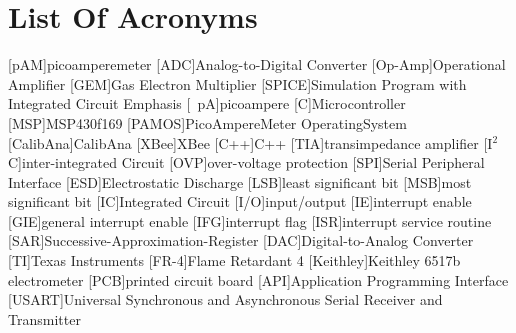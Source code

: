 \section{List Of Acronyms}
\begin{multicols}{2}
\begin{acronym}[aligator]
	[pAM]{picoamperemeter}%
	[ADC]{Analog-to-Digital Converter}%
	[Op-Amp]{Operational Amplifier}%
	[GEM]{Gas Electron Multiplier}%
	[SPICE]{Simulation Program with Integrated Circuit Emphasis}%
	[\SI{}{\pico\ampere}]{picoampere}%
	[\textmu C]{Microcontroller}%
	[MSP]{MSP430f169}%
	[PAMOS]{PicoAmpereMeter OperatingSystem}%
	[CalibAna]{CalibAna}%
	[XBee]{XBee}%
	[C++]{C++}%
	[TIA]{transimpedance amplifier}%
	[I$^2$C]{inter-integrated Circuit}%
	[OVP]{over-voltage protection}%
	[SPI]{Serial Peripheral Interface}
	[ESD]{Electrostatic Discharge}
	[LSB]{least significant bit}
	[MSB]{most significant bit}
	[IC]{Integrated Circuit}
	[I/O]{input/output}
	[IE]{interrupt enable}
	[GIE]{general interrupt enable}
	[IFG]{interrupt flag}
	[ISR]{interrupt service routine}	
	[SAR]{Successive-Approximation-Register}
	[DAC]{Digital-to-Analog Converter}
	[TI]{Texas Instruments}
	[FR-4]{Flame Retardant 4}
	[Keithley]{Keithley 6517b electrometer}
	[PCB]{printed circuit board}
	[API]{Application Programming Interface}
	[USART]{Universal Synchronous and Asynchronous Serial Receiver and Transmitter}
\end{acronym}
\end{multicols}
